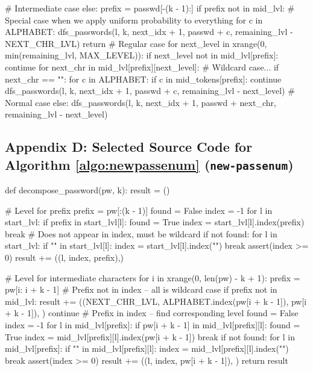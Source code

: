 \documentclass{article} %
\theoremstyle{definition}
\theoremstyle{theorem}
\theoremstyle{remark}
\theoremstyle{remark}
\begin{document}
\begin{python}
    # Intermediate case
    else:
        prefix = passwd[-(k - 1):]
        if prefix not in mid_lvl:
            # Special case when we apply uniform probability to everything
            for c in ALPHABET:
                dfs_passwords(l, k, next_idx + 1, passwd + c, remaining_lvl - NEXT_CHR_LVL)
            return
        # Regular case
        for next_level in xrange(0, min(remaining_lvl, MAX_LEVEL)):
            if next_level not in mid_lvl[prefix]:
                continue
            for next_chr in mid_lvl[prefix][next_level]:
                # Wildcard case...
                if next_chr == "":
                    for c in ALPHABET:
                        if c in mid_tokens[prefix]:
                            continue
                        dfs_passwords(l, k, next_idx + 1, passwd + c, remaining_lvl - next_level)
                # Normal case
                else:
                    dfs_passwords(l, k, next_idx + 1, passwd + next_chr, remaining_lvl - next_level)
\end{python}

\vspace{\fill}
\pagebreak
\subsection*{Appendix D: Selected Source Code for Algorithm \ref{algo:newpassenum} (\texttt{new-passenum})}

\begin{python}
def decompose_password(pw, k):
    result = ()

    # Level for prefix
    prefix = pw[:(k - 1)]
    found = False
    index = -1
    for l in start_lvl:
        if prefix in start_lvl[l]:
            found = True
            index = start_lvl[l].index(prefix)
            break
    # Does not appear in index, must be wildcard
    if not found:
        for l in start_lvl:
            if "" in start_lvl[l]:
                index = start_lvl[l].index("")
                break
    assert(index >= 0)
    result += ((l, index, prefix),)

    # Level for intermediate characters
    for i in xrange(0, len(pw) - k + 1):
        prefix = pw[i: i + k - 1]
        # Prefix not in index -- all is wildcard case
        if prefix not in mid_lvl:
            result += ((NEXT_CHR_LVL, ALPHABET.index(pw[i + k - 1]), pw[i + k - 1]), )
            continue
        # Prefix in index -- find corresponding level
        found = False
        index = -1
        for l in mid_lvl[prefix]:
            if pw[i + k - 1] in mid_lvl[prefix][l]:
                found = True
                index = mid_lvl[prefix][l].index(pw[i + k - 1])
                break
        if not found:
            for l in mid_lvl[prefix]:
                if "" in mid_lvl[prefix][l]:
                    index = mid_lvl[prefix][l].index("")
                    break
        assert(index >= 0)
        result += ((l, index, pw[i + k - 1]), )
    return result
\end{python}
\end{document}
